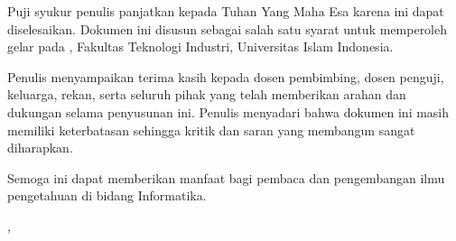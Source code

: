 
Puji syukur penulis panjatkan kepada Tuhan Yang Maha Esa karena \jenisDokumen{} ini dapat diselesaikan. Dokumen ini disusun sebagai salah satu syarat untuk memperoleh gelar \gelarTarget{} pada \namaProgramKalimat, Fakultas Teknologi Industri, Universitas Islam Indonesia.

Penulis menyampaikan terima kasih kepada dosen pembimbing, dosen penguji, keluarga, rekan, serta seluruh pihak yang telah memberikan arahan dan dukungan selama penyusunan \jenisDokumen{} ini. Penulis menyadari bahwa dokumen ini masih memiliki keterbatasan sehingga kritik dan saran yang membangun sangat diharapkan.

Semoga \jenisDokumen{} ini dapat memberikan manfaat bagi pembaca dan pengembangan ilmu pengetahuan di bidang Informatika.

\vfill
\begin{flushright}
  \kotaTerbit, \bulanLulus\ \tahunLulus\par
  \vspace{18mm}
  \namaMahasiswa
\end{flushright}

